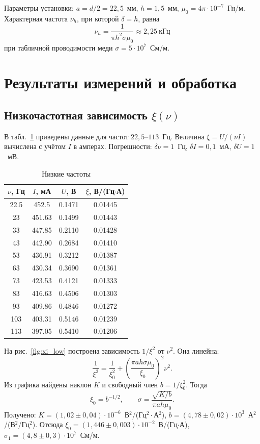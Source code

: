 \documentclass[a4paper,12pt]{article}
\begin{document}
Параметры установки: $a = d/2 = 22{,}5$~мм, $h = 1{,}5$~мм, $\mu_0 = 4\pi\cdot10^{-7}$~Гн/м. Характерная частота $\nu_h$, при которой $\delta=h$, равна
\[
    \nu_h = \frac{1}{\pi h^2\sigma\mu_0} \approx 2{,}25~\text{кГц}
\]
при табличной проводимости меди $\sigma=5\cdot10^7$~См/м.

\section{Результаты измерений и обработка}

\subsection{Низкочастотная зависимость $\xi(\nu)$}
В табл.~\ref{tab:xi_low} приведены данные для частот $22{,}5$--$113$~Гц. Величина $\xi = U/(\nu I)$ вычислена с учётом $I$ в амперах. Погрешности: $\delta\nu=1$~Гц, $\delta I=0{,}1$~мА, $\delta U=1$~мВ.

\begin{table}[H]
    \centering
    \caption{Низкие частоты}
    \label{tab:xi_low}
    \begin{tabular}{cccc}
        \toprule
        $\nu$, Гц & $I$, мА & $U$, В & $\xi$, В/(Гц$\cdot$А) \\
        \midrule
        22.5 & 452.5 & 0.1471 & 0.01445 \\
        23   & 451.63& 0.1499 & 0.01443 \\
        33   & 447.85& 0.2110 & 0.01428 \\
        43   & 442.90& 0.2684 & 0.01410 \\
        53   & 436.91& 0.3212 & 0.01387 \\
        63   & 430.34& 0.3690 & 0.01361 \\
        73   & 423.53& 0.4121 & 0.01333 \\
        83   & 416.63& 0.4506 & 0.01303 \\
        93   & 409.86& 0.4846 & 0.01272 \\
        103  & 403.31& 0.5146 & 0.01239 \\
        113  & 397.05& 0.5410 & 0.01206 \\
        \bottomrule
    \end{tabular}
\end{table}

На рис.~\ref{fig:xi_low} построена зависимость $1/\xi^2$ от $\nu^2$. Она линейна:
\[
    \frac{1}{\xi^2} = \frac{1}{\xi_0^2} + \left(\frac{\pi a h\sigma\mu_0}{\xi_0}\right)^2 \nu^2.
\]
Из графика найдены наклон $K$ и свободный член $b=1/\xi_0^2$. Тогда
\[
    \xi_0 = b^{-1/2},\qquad
    \sigma = \frac{\sqrt{K/b}}{\pi a h\mu_0}.
\]
Получено: $K = (1{,}02\pm0{,}04)\cdot10^{-6}$~В$^2$/(Гц$^2\cdot$А$^2$), $b = (4{,}78\pm0{,}02)\cdot10^{3}$~А$^2$/(В$^2$/Гц$^2$). Отсюда $\xi_0 = (1{,}446\pm0{,}003)\cdot10^{-2}$~В/(Гц$\cdot$А), $\sigma_1 = (4{,}8\pm0{,}3)\cdot10^7$~См/м.
\end{document}
